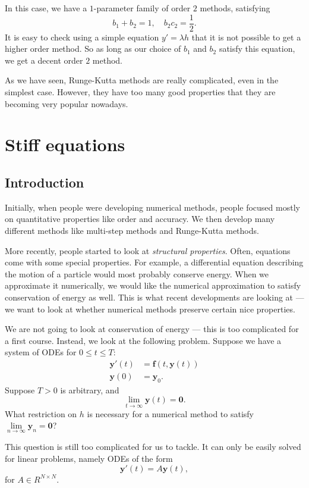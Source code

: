 \documentclass[a4paper]{article}
\begin{document}
In this case, we have a $1$-parameter family of order $2$ methods, satisfying
\[
  b_1 + b_2 = 1,\quad b_2c_2 = \frac{1}{2}.
\]
It is easy to check using a simple equation $y' = \lambda h$ that it is not possible to get a higher order method. So as long as our choice of $b_1$ and $b_2$ satisfy this equation, we get a decent order $2$ method.

As we have seen, Runge-Kutta methods are really complicated, even in the simplest case. However, they have too many good properties that they are becoming very popular nowadays.

\section{Stiff equations}
\subsection{Introduction}
Initially, when people were developing numerical methods, people focused mostly on quantitative properties like order and accuracy. We then develop many different methods like multi-step methods and Runge-Kutta methods.

More recently, people started to look at \emph{structural properties}. Often, equations come with some special properties. For example, a differential equation describing the motion of a particle would most probably conserve energy. When we approximate it numerically, we would like the numerical approximation to satisfy conservation of energy as well. This is what recent developments are looking at --- we want to look at whether numerical methods preserve certain nice properties.

We are not going to look at conservation of energy --- this is too complicated for a first course. Instead, we look at the following problem. Suppose we have a system of ODEs for $0 \leq t \leq T$:
\begin{align*}
  \mathbf{y}'(t) &= \mathbf{f}(t, \mathbf{y}(t))\\
  \mathbf{y}(0) &= \mathbf{y}_0.
\end{align*}
Suppose $T > 0$ is arbitrary, and
\[
  \lim_{t \to \infty} \mathbf{y}(t) = \mathbf{0}.
\]
What restriction on $h$ is necessary for a numerical method to satisfy $\lim\limits_{n \to \infty} \mathbf{y}_n = \mathbf{0}$?

This question is still too complicated for us to tackle. It can only be easily solved for linear problems, namely ODEs of the form
\[
  \mathbf{y}'(t) = A \mathbf{y}(t),
\]
for $A \in R^{N \times N}$.
\end{document}
